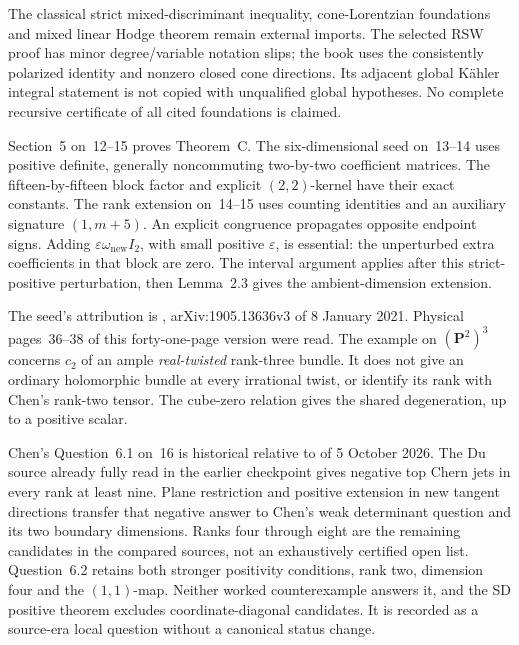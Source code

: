 The classical strict mixed-discriminant inequality,
cone-Lorentzian foundations and mixed linear Hodge theorem
remain external imports. The selected RSW proof has minor
degree/variable notation slips; the book uses the consistently
polarized identity and nonzero closed cone directions.
Its adjacent global K\"ahler integral statement is not copied
with unqualified global hypotheses. No complete recursive
certificate of all cited foundations is claimed.

Section~5 on~12--15 proves Theorem~C. The six-dimensional
seed on~13--14 uses positive definite, generally noncommuting
two-by-two coefficient matrices. The fifteen-by-fifteen block
factor and explicit $(2,2)$-kernel have their exact constants.
The rank extension on~14--15 uses counting identities and
an auxiliary signature $(1,m+5)$. An explicit congruence
propagates opposite endpoint signs. Adding
$\varepsilon\omega_{\mathrm{new}}I_2$, with small positive
$\varepsilon$, is essential: the unperturbed extra coefficients
in that block are zero. The interval argument applies after
this strict-positive perturbation, then Lemma~2.3 gives the
ambient-dimension extension.

The seed's attribution is
\cite[Example~9.2, physical p.~37]{RossToma21SchurHRV3},
arXiv:1905.13636v3 of 8 January 2021. Physical pages~36--38
of this forty-one-page version were read. The example on
$(\mathbf P^2)^3$ concerns $c_2$ of an ample \emph{real-twisted}
rank-three bundle. It does not give an ordinary holomorphic
bundle at every irrational twist, or identify its rank with
Chen's rank-two tensor. The cube-zero relation gives the
shared degeneration, up to a positive scalar.

Chen's Question~6.1 on~16 is historical relative to
\cite[Theorem~1.1]{Du26GriffithsTopChernV1} of 5 October 2026.
The Du source already fully read in the earlier checkpoint
gives negative top Chern jets in every rank at least nine.
Plane restriction and positive extension in new tangent
directions transfer that negative answer to Chen's weak
determinant question and its two boundary dimensions.
Ranks four through eight are the remaining candidates in
the compared sources, not an exhaustively certified open
list. Question~6.2 retains both stronger positivity conditions,
rank two, dimension four and the $(1,1)$-map. Neither
worked counterexample answers it, and the SD positive theorem
excludes coordinate-diagonal candidates. It is recorded as
a source-era local question without a canonical status change.

